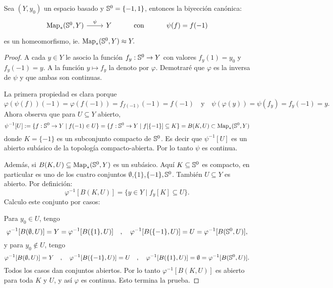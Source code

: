 
\begin{ejercicio}\label{ej:13}
	Sea $(Y,y_0)$ un espacio basado y $\mathbb{S}^0=\{-1,1\}$, entonces la biyecci\'on can\'onica:
	\[\begin{tikzcd}
		\text{Map}_*(\Sn^0,Y)\arrow[r,"\psi"] &  Y & \text{con} & \psi(f)=f(-1) 
        \end{tikzcd}\]
        es un homeomorfismo, ie. $\text{Map}_*(\mathbb{S}^0,Y)\approx Y.$
\end{ejercicio}

\begin{proof}%
  A cada $y\in Y$ le asocio la funci\'on $f_y:\mathbb{S}^0\rightarrow Y$ con valores $f_y(1)=y_0$ y $f_y(-1)=y$.
  A la funci\'on $y\mapsto f_y$ la denoto por $\varphi$. Demotrar\'e que $\varphi$ es la inversa
  de $\psi$ y que ambas son continuas.
  
  La primera propiedad es clara porque
  \[
    \varphi(\psi(f))(-1)=\varphi(f(-1))=f_{f(-1)}(-1)=f(-1) \quad\text{y}\quad
    \psi(\varphi(y))=\psi(f_y)=f_y(-1)=y.
  \]
  Ahora observa que para $U\subseteq Y$ abierto,
  \[
    \psi^{-1}[U]:=\{f:\mathbb{S}^0\rightarrow Y\mid f(-1)\in U\}=
    \{f:\mathbb{S}^0\rightarrow Y\mid f[\{-1\}] \subseteq K\}=
    B(K,U)\subset\text{Map}_*(\mathbb{S}^0,Y)
  \]
  donde $K=\{-1\}$ es un subconjunto compacto de $\mathbb{S}^0$. Es decir que $\psi^{-1}[U]$ es un abierto
  sub\'asico de la topolog\'ia compacto-abierta. Por lo tanto $\psi$ es continua.

  Adem\'as, si $B(K,U)\subseteq\text{Map}_*(\mathbb{S}^0,Y)$ es un sub\'asico. Aqu\'i $K\subseteq\mathbb{S}^0$
  es compacto, en particular es uno de los cuatro conjuntos $\emptyset$,$\{1\}$,$\{-1\},\mathbb{S}^0$.
  Tambi\'en $U\subseteq Y$ es abierto. Por definici\'on:
  \[
    \varphi^{-1}[B(K,U)]=\{y\in Y\mid f_y[K]\subseteq U\}.
  \]
  Calculo este conjunto por casos:
  
  Para $y_0\in U$, tengo
  \[
    \varphi^{-1}[B(\emptyset,U)] = Y = \varphi^{-1}[B(\{1\},U)] \quad,\quad
    \varphi^{-1}[B(\{-1\},U)] = U = \varphi^{-1}[B(\mathbb{S}^0,U)],
  \]
  y para $y_0\not\in U$, tengo
  \[
    \varphi^{-1}[B(\emptyset,U)] = Y \quad,\quad
    \varphi^{-1}[B(\{-1\},U)] = U \quad,\quad
    \varphi^{-1}[B(\{1\},U)] = \emptyset = \varphi^{-1}[B(\mathbb{S}^0,U)].
  \]
  Todos los casos dan conjuntos abiertos. Por lo tanto $\varphi^{-1}[B(K,U)]$ es abierto para
  toda $K$ y $U$, y as\'i $\varphi$ es continua. Esto termina la prueba.
\end{proof}%


